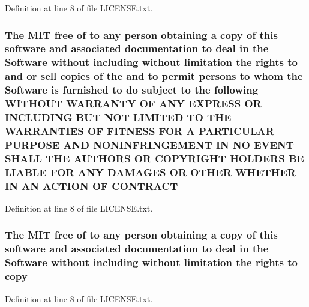 Definition at line 8 of file L\+I\+C\+E\+N\+S\+E.\+txt.

\subsubsection[{\texorpdfstring{C\+O\+N\+T\+R\+A\+CT}{CONTRACT}}]{\setlength{\rightskip}{0pt plus 5cm}The M\+IT free of to any person obtaining a {\bf copy} of this software and associated documentation to deal in the {\bf Software} without including without limitation the rights to and or sell copies of the and to permit persons to whom the {\bf Software} is furnished to do subject to the following W\+I\+T\+H\+O\+UT W\+A\+R\+R\+A\+N\+TY OF A\+NY E\+X\+P\+R\+E\+SS OR I\+N\+C\+L\+U\+D\+I\+NG B\+UT N\+OT L\+I\+M\+I\+T\+ED TO T\+HE W\+A\+R\+R\+A\+N\+T\+I\+ES OF F\+I\+T\+N\+E\+SS F\+OR A P\+A\+R\+T\+I\+C\+U\+L\+AR P\+U\+R\+P\+O\+SE A\+ND N\+O\+N\+I\+N\+F\+R\+I\+N\+G\+E\+M\+E\+NT IN NO E\+V\+E\+NT S\+H\+A\+LL T\+HE A\+U\+T\+H\+O\+RS OR C\+O\+P\+Y\+R\+I\+G\+HT H\+O\+L\+D\+E\+RS BE L\+I\+A\+B\+LE F\+OR A\+NY D\+A\+M\+A\+G\+ES OR O\+T\+H\+ER W\+H\+E\+T\+H\+ER IN AN A\+C\+T\+I\+ON OF C\+O\+N\+T\+R\+A\+CT}\hypertarget{LICENSE_8txt_a808df707d490e1041f54a1d24fbbfaa0}{}\label{LICENSE_8txt_a808df707d490e1041f54a1d24fbbfaa0}


Definition at line 8 of file L\+I\+C\+E\+N\+S\+E.\+txt.

\subsubsection[{\texorpdfstring{copy}{copy}}]{\setlength{\rightskip}{0pt plus 5cm}The M\+IT free of to any person obtaining a copy of this software and associated documentation to deal in the {\bf Software} without including without limitation the rights to copy}\hypertarget{LICENSE_8txt_aff1d4c6b756ebf691fa44a0904f68658}{}\label{LICENSE_8txt_aff1d4c6b756ebf691fa44a0904f68658}


Definition at line 8 of file L\+I\+C\+E\+N\+S\+E.\+txt.

